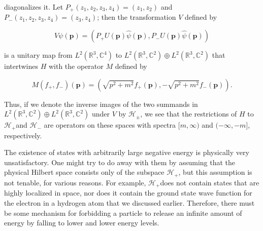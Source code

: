 \documentclass[10pt, letterpaper]{article}
\begin{document}
diagonalizes it. Let $P_{+}\left(z_{1}, z_{2}, z_{3}, z_{4}\right)=\left(z_{1}, z_{2}\right)$ and $P_{-}\left(z_{1}, z_{2}, z_{3}, z_{4}\right)=\left(z_{3}, z_{4}\right)$; then the transformation $V$ defined by

$$
V \psi(\mathbf{p})=\left(P_{+} U(\mathbf{p}) \widehat{\psi}(\mathbf{p}), P_{-} U(\mathbf{p}) \widehat{\psi}(\mathbf{p})\right)
$$

is a unitary map from $L^{2}\left(\mathbb{R}^{3}, \mathbb{C}^{4}\right)$ to $L^{2}\left(\mathbb{R}^{3}, \mathbb{C}^{2}\right) \oplus L^{2}\left(\mathbb{R}^{3}, \mathbb{C}^{2}\right)$ that intertwines $H$ with the operator $M$ defined by

$$
M\left(f_{+}, f_{-}\right)(\mathbf{p})=\left(\sqrt{p^{2}+m^{2}} f_{+}(\mathbf{p}),-\sqrt{p^{2}+m^{2}} f_{-}(\mathbf{p})\right) .
$$

Thus, if we denote the inverse images of the two summands in $L^{2}\left(\mathbb{R}^{3}, \mathbb{C}^{2}\right) \oplus L^{2}\left(\mathbb{R}^{3}, \mathbb{C}^{2}\right)$ under $V$ by $\mathcal{H}_{ \pm}$, we see that the restrictions of $H$ to $\mathcal{H}_{+}$and $\mathcal{H}_{-}$ are operators on these spaces with spectra $[m, \infty)$ and $(-\infty,-m]$, respectively.

The existence of states with arbitrarily large negative energy is physically very unsatisfactory. One might try to do away with them by assuming that the physical Hilbert space consists only of the subspace $\mathcal{H}_{+}$, but this assumption is not tenable, for various reasons. For example, $\mathcal{H}_{+}$does not contain states that are highly localized in space, nor does it contain the ground state wave function for the electron in a hydrogen atom that we discussed earlier. Therefore, there must be some mechanism for forbidding a particle to release an infinite amount of energy by falling to lower and lower energy levels.
\end{document}
